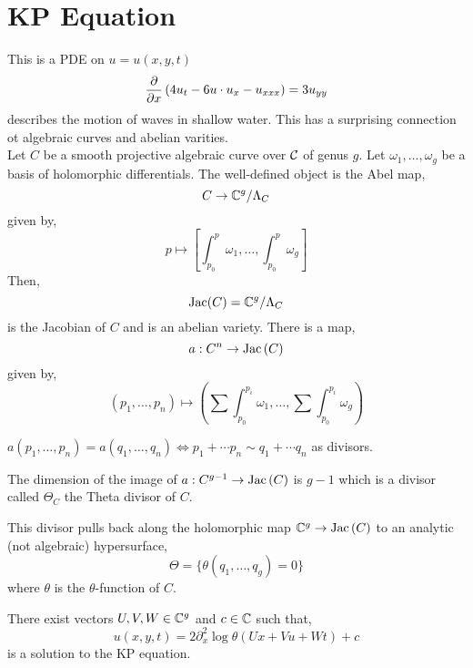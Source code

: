 \documentclass[12pt]{article}
\begin{document}
\section{KP Equation} 


This is a PDE on $u = u(x,y,t)$ 
\[ \frac{\partial{}}{\partial{x}} \left( 4 u_t - 6 u \cdot u_ x - u_{xxx} \right) = 3 u_{yy} \]
describes the motion of waves in shallow water. This has a surprising connection ot algebraic curves and abelian varities.
\bigskip\\
Let $C$ be a smooth projective algebraic curve over $\mathcal{C}$ of genus $g$. Let $\omega_1, \dots, \omega_g$ be a basis of holomorphic differentials. The well-defined object is the Abel map,
\[ C \to \mathbb{C}^g / \Lambda_C \]
given by,
\[ p \mapsto \left[ \int_{p_0}^p \omega_1, \dots, \int_{p_0}^p \omega_g \right] \]
Then,
\[ \mathrm{Jac}(C) = \mathbb{C}^g / \Lambda_C \]
is the Jacobian of $C$ and is an abelian variety. There is a map,
\[ a : C^n \to \mathrm{Jac}\left( C \right) \] 
given by,
\[ (p_1, \dots, p_n) \mapsto \left( \sum \int_{p_0}^{p_i} \omega_1, \dots, \sum \int_{p_0}^{p_i} \omega_g \right) \]

\begin{theorem}[Abel]
$a(p_1, \dots, p_n) = a(q_1, \dots, q_n) \iff p_1 + \cdots p_n \sim q_1 + \cdots q_n$ as divisors.
\end{theorem}

\begin{cor}
The dimension of the image of $a : C^{g-1} \to \mathrm{Jac}\left( C \right)$ is $g-1$ which is a divisor called $\Theta_C$ the Theta divisor of $C$. 
\end{cor}

\begin{rmk}
This divisor pulls back along the holomorphic map $\mathbb{C}^g \to \mathrm{Jac}\left( C \right)$ to an analytic (not algebraic) hypersurface,
\[ \Theta = \{ \theta(q_1, \dots, q_g) = 0 \} \]
where $\theta$ is the $\theta$-function of $C$. 
\end{rmk}

\begin{theorem}[Krichnever]
There exist vectors $U,V,W \in \mathbb{C}^g$ and $c \in \mathbb{C}$ such that,
\[ u(x,y,t) = 2 \partial_x^2 \log{\theta(U x + V u + W t)} + c \]
is a solution to the KP equation.
\end{theorem}
\end{document}
